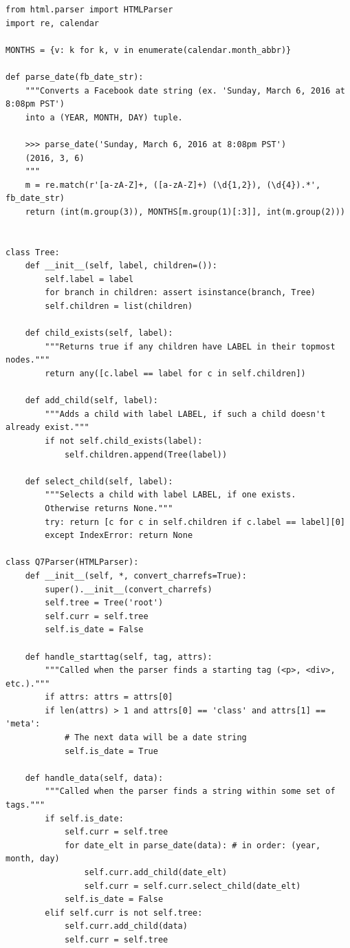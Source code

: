 \documentclass[11pt]{article}
\begin{document}
\begin{lstlisting}
from html.parser import HTMLParser
import re, calendar

MONTHS = {v: k for k, v in enumerate(calendar.month_abbr)}

def parse_date(fb_date_str):
    """Converts a Facebook date string (ex. 'Sunday, March 6, 2016 at 8:08pm PST')
    into a (YEAR, MONTH, DAY) tuple.
    
    >>> parse_date('Sunday, March 6, 2016 at 8:08pm PST')
    (2016, 3, 6)
    """
    m = re.match(r'[a-zA-Z]+, ([a-zA-Z]+) (\d{1,2}), (\d{4}).*', fb_date_str)
    return (int(m.group(3)), MONTHS[m.group(1)[:3]], int(m.group(2)))
    
    
class Tree:
    def __init__(self, label, children=()):
        self.label = label
        for branch in children: assert isinstance(branch, Tree)
        self.children = list(children)
        
    def child_exists(self, label):
        """Returns true if any children have LABEL in their topmost nodes."""
        return any([c.label == label for c in self.children])
    
    def add_child(self, label):
        """Adds a child with label LABEL, if such a child doesn't already exist."""
        if not self.child_exists(label):
            self.children.append(Tree(label))
        
    def select_child(self, label):
        """Selects a child with label LABEL, if one exists.
        Otherwise returns None."""
        try: return [c for c in self.children if c.label == label][0]
        except IndexError: return None

class Q7Parser(HTMLParser):
    def __init__(self, *, convert_charrefs=True):
        super().__init__(convert_charrefs)
        self.tree = Tree('root')
        self.curr = self.tree
        self.is_date = False
        
    def handle_starttag(self, tag, attrs):
        """Called when the parser finds a starting tag (<p>, <div>, etc.)."""
        if attrs: attrs = attrs[0]
        if len(attrs) > 1 and attrs[0] == 'class' and attrs[1] == 'meta':
            # The next data will be a date string
            self.is_date = True
        
    def handle_data(self, data):
        """Called when the parser finds a string within some set of tags."""
        if self.is_date:
            self.curr = self.tree
            for date_elt in parse_date(data): # in order: (year, month, day)
                self.curr.add_child(date_elt)
                self.curr = self.curr.select_child(date_elt)
            self.is_date = False
        elif self.curr is not self.tree:
            self.curr.add_child(data)
            self.curr = self.tree
    

\end{lstlisting}
\end{document}
